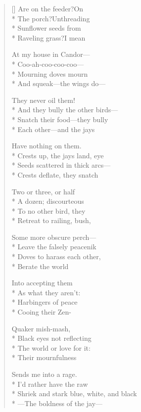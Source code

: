\label{ch:what_birds}
\settowidth{\versewidth}{Shriek and stark blue, white, and black}
\begin{verse}[\versewidth]
Are on the feeder?\quad On\\*
The porch?\quad Unthreading\\*
Sunflower seeds from\\*
Raveling grass?\qquad I mean

At my house in Candor---\\*
Coo-ah-coo-coo-coo---\\*
Mourning doves mourn\\*
And squeak---the wings do---

They never oil them!\\*
And they bully the other birds---\\*
Snatch their food---they bully\\*
Each other---and the jays

Have nothing on them.\\*
Crests up, the jays land, eye\\*
Seeds scattered in thick arcs---\\*
Crests deflate, they snatch

Two or three, or half\\*
A dozen; discourteous\\*
To no other bird, they\\*
Retreat to railing, bush,

Some more obscure perch---\\*
Leave the falsely peacenik\\*
Doves to harass each other,\\*
Berate the world

Into accepting them\\*
As what they aren't:\\*
Harbingers of peace\\*
Cooing their Zen-

Quaker mish-mash,\\*
Black eyes not reflecting\\*
The world or love for it:\\*
Their mournfulness

Sends me into a rage.\\*
I'd rather have the raw\\*
Shriek and stark blue, white, and black\\*
---The boldness of the jay---


\end{verse}
